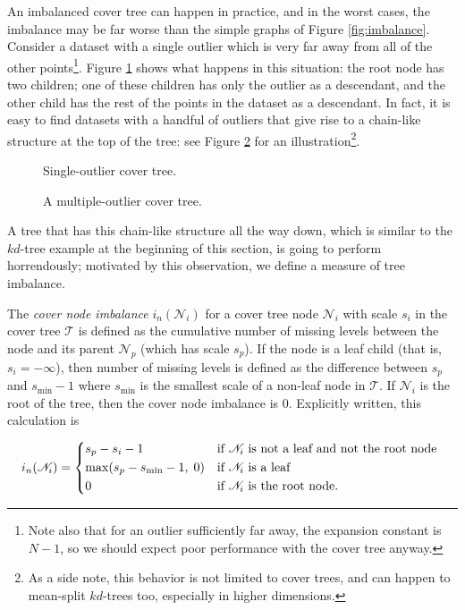 An imbalanced cover tree can happen in practice, and in the worst cases, the
imbalance may be far worse than the simple graphs of Figure \ref{fig:imbalance}.
Consider a dataset with a single outlier which is very far away from all of the
other points\footnote{Note also that for an outlier sufficiently far away, the
expansion constant is $N - 1$, so we should expect poor performance with the
cover tree anyway.}.  Figure \ref{fig:outlier} shows what happens in
this situation: the root node has two children; one of these children has only
the outlier as a descendant, and the other child has the rest of the points in
the dataset as a descendant.  In fact, it is easy to find datasets with a
handful of outliers that give rise to a chain-like structure at the top of the
tree: see Figure \ref{fig:outliers} for an illustration\footnote{As a side note,
this behavior is not limited to cover trees, and can happen to mean-split
$kd$-trees too, especially in higher dimensions.}.

\begin{figure}
\begin{center}
  
\end{center}
\caption{Single-outlier cover tree.}
\label{fig:outlier}
\end{figure}

\begin{figure}
\begin{center}
  
\end{center}
\caption{A multiple-outlier cover tree.}
\label{fig:outliers}
\end{figure}

A tree that has this chain-like structure all the way down, which is similar to
the $kd$-tree example at the beginning of this section, is going to perform
horrendously; motivated by this observation, we define a measure of tree
imbalance.

\begin{defn}
The {\it cover node imbalance} $i_n(\mathscr{N}_i)$ for a cover tree node
$\mathscr{N}_i$ with scale $s_i$ in the cover tree $\mathscr{T}$ is defined as
the cumulative number of missing levels between the node and its parent
$\mathscr{N}_p$ (which has scale $s_p$).  If
the node is a leaf child (that is, $s_i = -\infty$), then number of missing
levels is defined as the difference between $s_p$ and $s_{\min} - 1$ where
$s_{\min}$ is the smallest scale of a non-leaf node in $\mathscr{T}$.  If
$\mathscr{N}_i$ is the root of the tree, then the cover node imbalance is 0.
Explicitly written, this calculation is

\begin{equation}
i_n(\mathscr{N}_i) = \begin{dcases*}
  s_p - s_i - 1 & if $\mathscr{N}_i$ is not a leaf and not the root node \\
  \max(s_p - s_{\min} - 1, \; 0) & if $\mathscr{N}_i$ is a leaf \\
  0 & if $\mathscr{N}_i$ is the root node.
  \end{dcases*}
  \label{eqn_node_imbalance}
\end{equation}
\end{defn}

